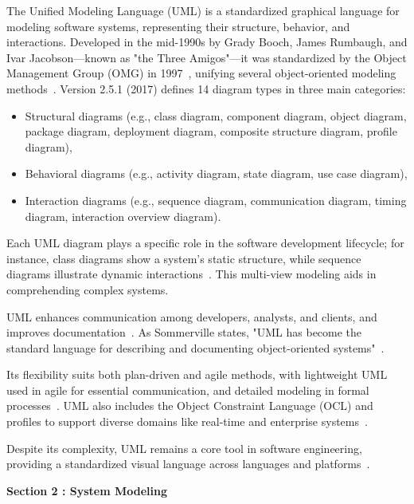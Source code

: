 \documentclass[12pt,a4paper]{report}
\begin{document}
The Unified Modeling Language (UML) is a standardized graphical language for modeling software systems, representing their structure, behavior, and interactions. Developed in the mid-1990s by Grady Booch, James Rumbaugh, and Ivar Jacobson—known as "the Three Amigos"—it was standardized by the Object Management Group (OMG) in 1997~\cite{omg2017}, unifying several object-oriented modeling methods~\cite{pressman2014}. Version 2.5.1 (2017) defines 14 diagram types in three main categories:
\begin{itemize}
\item Structural diagrams (e.g., class diagram, component diagram, object diagram, package diagram, deployment diagram, composite structure diagram, profile diagram),
\item Behavioral diagrams (e.g., activity diagram, state diagram, use case diagram),
\item Interaction diagrams (e.g., sequence diagram, communication diagram, timing diagram, interaction overview diagram).
\end{itemize}
Each UML diagram plays a specific role in the software development lifecycle; for instance, class diagrams show a system’s static structure, while sequence diagrams illustrate dynamic interactions~\cite{sommerville2015}. This multi-view modeling aids in comprehending complex systems.

UML enhances communication among developers, analysts, and clients, and improves documentation~\cite{omg2017}. As Sommerville states, "UML has become the standard language for describing and documenting object-oriented systems"~\cite{sommerville2015}.

Its flexibility suits both plan-driven and agile methods, with lightweight UML used in agile for essential communication, and detailed modeling in formal processes~\cite{pressman2014}. UML also includes the Object Constraint Language (OCL) and profiles to support diverse domains like real-time and enterprise systems~\cite{omg2017}.

Despite its complexity, UML remains a core tool in software engineering, providing a standardized visual language across languages and platforms~\cite{sommerville2015}.


\vspace{3cm}


\newpage
\vspace{0.3cm}

\begin{tcolorbox}[
    colback=mintgreen!20, 
    colframe=mintgreen!80!black, 
    width=\textwidth, 
    boxrule=1pt, 
    arc=5pt, 
    auto outer arc,
    left=10pt,
    right=10pt,
    top=6pt,
    bottom=6pt
]
    \centering
    \Large \textbf{Section 2 : System Modeling} %
\end{tcolorbox}
\end{document}
